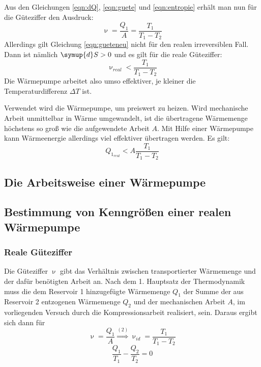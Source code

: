 Aus den Gleichungen \eqref{eqn:dQ}, \eqref{eqn:guete} und \eqref{eqn:entropie} erhält man nun für die Güteziffer den Ausdruck:
\begin{equation}
	\label{eqn:gueteneu}
	\upnu = \frac{Q_1}{A} = \frac{T_1}{T_1 - T_2}
\end{equation}
Allerdings gilt Gleichung \eqref{eqn:gueteneu} nicht für den realen irreversiblen Fall. 
Dann ist nämlich $\symup{d}S > 0$ und es gilt für die reale Güteziffer:
\begin{equation}
	\upnu_{real} < \frac{T_1}{T_1 - T_2}
\end{equation}
Die Wärmepumpe arbeitet also umso effektiver, je kleiner die Temperaturdifferenz $\Delta T$ ist.

Verwendet wird die Wärmepumpe, um preiswert zu heizen.
Wird mechanische Arbeit unmittelbar in Wärme umgewandelt, ist die übertragene Wärmemenge höchstens so groß wie die aufgewendete Arbeit $A$.
Mit Hilfe einer Wärmepumpe kann Wärmeenergie allerdings viel effektiver übertragen werden. Es gilt:
\begin{equation}
	Q_{1_{real}} < A \frac{T_1}{T_1 - T_2}
\end{equation}


\subsection{Die Arbeitsweise einer Wärmepumpe}


\subsection{Bestimmung von Kenngrößen einer realen Wärmepumpe}

\subsubsection {Reale Güteziffer}
\label{sec:güteziffer}
Die Güteziffer $\upnu$ gibt das Verhältnis zwischen transportierter Wärmemenge und der dafür benötigten Arbeit an. Nach dem 1. Hauptsatz der Thermodynamik muss die dem Reservoir 1 hinzugefügte Wärmemenge $Q_1$
der Summe der aus Reservoir 2 entzogenen Wärmemenge $Q_2$ und der mechanischen Arbeit $A$, im vorliegenden Versuch durch die Kompressionsarbeit realisiert, sein.
Daraus ergibt sich dann für
\begin{equation}
  \label{eqn:equation5}
  \upnu=\frac{Q_1}{A}\stackrel{(2)}{\Rightarrow} \upnu_{id}=\frac{T_1}{T_1-T_2}
\end{equation}
\begin{equation}
  \frac{Q_1}{T_1}-\frac{Q_2}{T_2}=0
	\label{eqn:equation6}
\end{equation}
